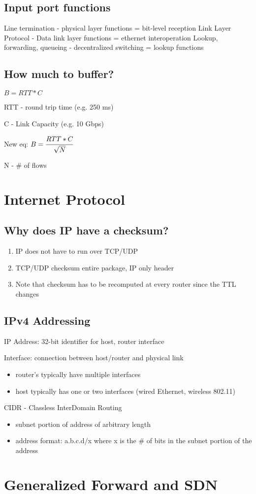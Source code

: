 \documentclass{article}
\begin{document}
	\subsection{Input port functions}
	
	Line termination - physical layer functions = bit-level reception
	Link Layer Protocol - Data link layer functions = ethernet interoperation
	Lookup, forwarding, queueing - decentralized switching = lookup functions
	
	\subsection{How much to buffer?}
	
	$B = RTT * C$
	
	RTT - round trip time (e.g. 250 ms)
	
	C - Link Capacity (e.g. 10 Gbps)
	
	New eq: $B = \cfrac{RTT * C}{\sqrt{N}}$
	
	N - \# of flows
	
	\section{Internet Protocol}
	
	\subsection{Why does IP have a checksum?}
	
	\begin{enumerate}[noitemsep]
		\item IP does not have to run over TCP/UDP
		\item TCP/UDP checksum entire package, IP only header
		\item Note that checksum has to be recomputed at every router since the TTL changes
	\end{enumerate}
	
	\subsection{IPv4 Addressing}
	
	IP Address: 32-bit identifier for host, router interface
	
	\noindent Interface: connection between host/router and physical link
	\begin{itemize}[noitemsep, nolistsep]
		\item router's typically have multiple interfaces
		\item host typically has one or two interfaces (wired Ethernet, wireless 802.11)
	\end{itemize}
	
	\noindent CIDR - Classless InterDomain Routing
	\begin{itemize}[noitemsep]
		\item subnet portion of address of arbitrary length
		\item address format: a.b.c.d/x where x is the \# of bits in the subnet portion of the address
	\end{itemize}
	
	\section{Generalized Forward and SDN}
\end{document}
